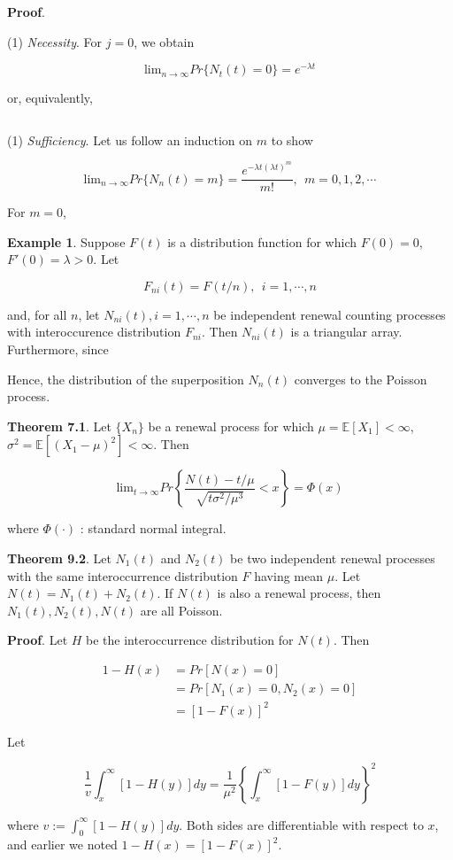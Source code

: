 \documentclass[12pt]{article}
\theoremstyle{nonumberbreak}
\begin{document}
\textbf{Proof}. 

(1) \textit{Necessity}. For $j=0$, we obtain 

$$
\mathrm{lim}_{n\to \infty} Pr \{ N_t(t) = 0 \} = e^{-\lambda t}
$$

or, equivalently,

$$
\
$$


(1) \textit{Sufficiency}. Let us follow an induction on $m$ to show

$$
\mathrm{lim}_{n\to\infty} Pr \{ N_n(t) = m \} = \frac{e^{-\lambda t (\lambda t)^m}}{m!}, \ \ m=0,1,2,\cdots
$$

For $m=0$, 





\textbf{Example 1}. Suppose $F(t)$ is a distribution function for which $F(0) = 0$, $F'(0) = \lambda >0$. Let

$$
F_{ni}(t) = F(t/n), \ \ i=1,\cdots,n
$$

and, for all $n$, let $N_{ni} (t), i=1,\cdots,n$ be independent renewal counting processes with interoccurence distribution $F_{ni}$. Then $N_{ni} (t)$ is a triangular array. Furthermore, since 




Hence, the distribution of the superposition $N_n(t)$ converges to the Poisson process. 



\begin{theorem}
\textbf{Theorem 7.1}. Let $\{  X_n \}$ be a renewal process for which $\mu = \mathbb{E} [ X_1] < \infty$, $\sigma^2 = \mathbb{E}\left[ (X_1 - \mu)^2 \right] < \infty$. Then 

$$
\mathrm{lim}_{t\to\infty} Pr \left\{ \frac{N(t)-t/\mu}{\sqrt{t\sigma^2/\mu^3}} < x \right\} = \Phi(x)
$$

where $\Phi(\cdot)$ : standard normal integral.
\end{theorem}





\begin{theorem}
\textbf{Theorem 9.2}. Let $N_1(t)$ and $N_2(t)$ be two independent renewal processes with the same interoccurrence distribution $F$ having mean $\mu$. Let $N(t) = N_1(t) + N_2(t)$. If $N(t)$ is also a renewal process, then $N_1(t), N_2(t), N(t)$ are all Poisson.
\end{theorem}


\textbf{Proof}. Let $H$ be the interoccurrence distribution for $N(t)$. Then 

$$
\begin{aligned}
1 - H(x) &= Pr[N(x) = 0] \\[8pt]
&= Pr[N_1(x)=0, N_2(x)=0] \\[8pt]
&= [1-F(x)]^2
\end{aligned}
$$

Let 



$$
\frac{1}{v} \int_x^\infty [1-H(y)]dy = \frac{1}{\mu^2} \left\{ \int_x^\infty [1-F(y)] dy \right\}^2
$$

where $v := \int_0^\infty [1-H(y)] dy$. Both sides are differentiable with respect to $x$, and earlier we noted $1-H(x) = [1-F(x)]^2$.  
\end{document}
